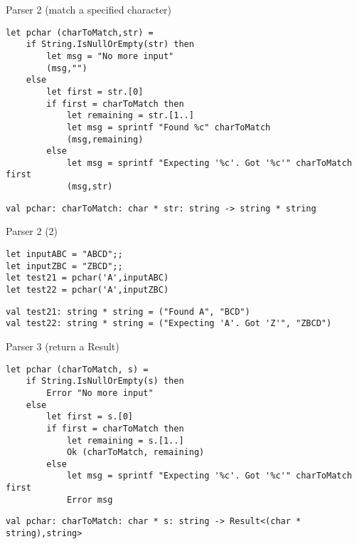 \documentclass[t]{beamer}
\begin{document}
\begin{frame}[label={sec:orgc4ae52c},fragile]{Parser 2 (match a specified character)}
 \begin{verbatim}
let pchar (charToMatch,str) =
    if String.IsNullOrEmpty(str) then
        let msg = "No more input"
        (msg,"")
    else 
        let first = str.[0] 
        if first = charToMatch then
            let remaining = str.[1..]
            let msg = sprintf "Found %c" charToMatch
            (msg,remaining)
        else
            let msg = sprintf "Expecting '%c'. Got '%c'" charToMatch first
            (msg,str)
\end{verbatim}

\begin{verbatim}
val pchar: charToMatch: char * str: string -> string * string
\end{verbatim}
\end{frame}


\begin{frame}[label={sec:org82f0e21},fragile]{Parser 2 (2)}
 \begin{verbatim}
let inputABC = "ABCD";;
let inputZBC = "ZBCD";;
let test21 = pchar('A',inputABC) 
let test22 = pchar('A',inputZBC)
\end{verbatim}

\begin{verbatim}
val test21: string * string = ("Found A", "BCD")
val test22: string * string = ("Expecting 'A'. Got 'Z'", "ZBCD")
\end{verbatim}
\end{frame}

\begin{frame}[label={sec:orgfd2993e},fragile]{Parser 3 (return a Result)}
 \begin{verbatim}
let pchar (charToMatch, s) =
    if String.IsNullOrEmpty(s) then
        Error "No more input"
    else
        let first = s.[0]
        if first = charToMatch then
            let remaining = s.[1..]
            Ok (charToMatch, remaining)
        else
            let msg = sprintf "Expecting '%c'. Got '%c'" charToMatch first
            Error msg
\end{verbatim}

\begin{verbatim}
val pchar: charToMatch: char * s: string -> Result<(char * string),string>
\end{verbatim}
\end{frame}
\end{document}

